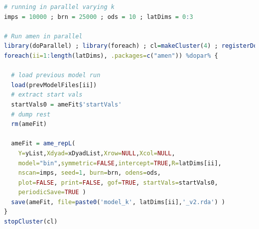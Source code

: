 \begin{lstlisting}[language=R]
# running in parallel varying k
imps = 10000 ; brn = 25000 ; ods = 10 ; latDims = 0:3

# Run amen in parallel
library(doParallel) ; library(foreach) ; cl=makeCluster(4) ; registerDoParallel(cl)
foreach(ii=1:length(latDims), .packages=c("amen")) %dopar% {
  
  # load previous model run
  load(prevModelFiles[ii])
  # extract start vals
  startVals0 = ameFit$'startVals'
  # dump rest
  rm(ameFit)
  
  ameFit = ame_repL(
    Y=yList,Xdyad=xDyadList,Xrow=NULL,Xcol=NULL, 
    model="bin",symmetric=FALSE,intercept=TRUE,R=latDims[ii], 
    nscan=imps, seed=1, burn=brn, odens=ods, 
    plot=FALSE, print=FALSE, gof=TRUE, startVals=startVals0,
    periodicSave=TRUE )     
  save(ameFit, file=paste0('model_k', latDims[ii],'_v2.rda') )
}
stopCluster(cl)
\end{lstlisting}